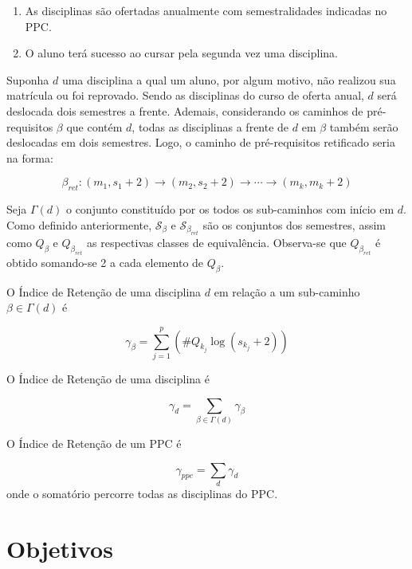\documentclass[a4paper, 12pt]{article}
\begin{document}
\begin{enumerate}
\item As disciplinas são ofertadas anualmente com semestralidades indicadas no PPC.
\item O aluno terá sucesso ao cursar pela segunda vez uma disciplina. 
\end{enumerate}

Suponha $d$ uma disciplina a qual um aluno, por algum motivo, não realizou sua matrícula ou foi reprovado. Sendo as disciplinas do curso de oferta anual, 
$d$ será deslocada dois semestres a frente. Ademais, considerando os caminhos de pré-requisitos $\beta$ que contém $d$, todas as disciplinas a frente de 
$d$ em $\beta$ também serão deslocadas em dois semestres. Logo, o caminho de pré-requisitos retificado seria na forma:

$$ \beta_{ret}: (m_1, s_1 + 2) \rightarrow (m_2, s_2 + 2) \rightarrow \cdots \rightarrow (m_k, m_k +2) $$

Seja $\Gamma(d)$ o conjunto constituído por os todos os sub-caminhos com início em $d$. Como definido anteriormente, $\mathcal{S}_\beta$ e 
$\mathcal{S}_{\beta_{ret}}$ são os conjuntos dos semestres, assim como $Q_\beta$ e $Q_{\beta_{ret}}$ as respectivas classes de 
equivalência. Observa-se que $Q_{\beta_{ret}}$ é obtido somando-se 2 a cada elemento de $Q_\beta$.

\begin{definicao}
O Índice de Retenção de uma disciplina $d$ em relação a um sub-caminho $\beta \in \Gamma(d)$ é

$$ \gamma_{\beta} = \sum_{j = 1}^{p}(\#Q_{k_j} \log(s_{k_j}+2)) $$
\end{definicao}

\begin{definicao}
O Índice de Retenção de uma disciplina é

$$ \gamma_d = \sum_{\beta \in \Gamma(d)} \gamma_\beta $$
\end{definicao}

\begin{definicao}
O Índice de Retenção de um PPC é

$$ \gamma_{ppc} = \sum_{d} \gamma_d $$
onde o somatório percorre todas as disciplinas do PPC.
\end{definicao}

\section*{Objetivos}
\end{document}
